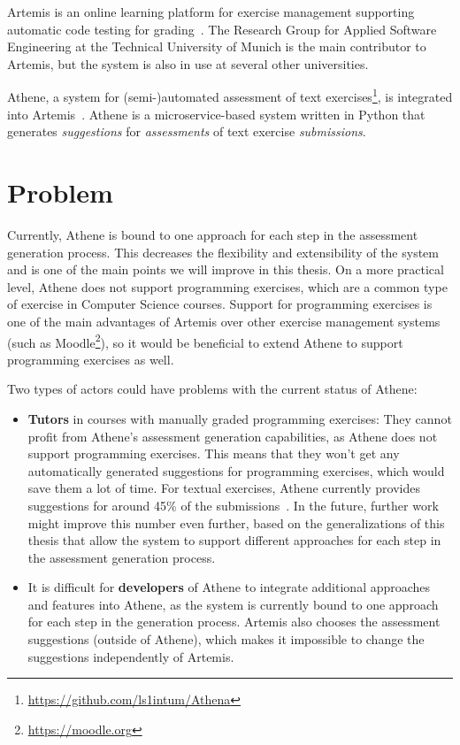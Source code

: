 Artemis is an online learning platform for exercise management supporting automatic code testing for grading~\cite{ArTEMiS}. The Research Group for Applied Software Engineering at the Technical University of Munich is the main contributor to Artemis, but the system is also in use at several other universities.

Athene, a system for (semi-)automated assessment of text exercises\footnote{\url{https://github.com/ls1intum/Athena}}, is integrated into Artemis~\cite{cofee}. Athene is a microservice-based system written in Python that generates \textit{suggestions} for \textit{assessments} of text exercise \textit{submissions}.


\section*{Problem}

Currently, Athene is bound to one approach for each step in the assessment generation process. This decreases the flexibility and extensibility of the system and is one of the main points we will improve in this thesis.
On a more practical level, Athene does not support programming exercises, which are a common type of exercise in Computer Science courses. Support for programming exercises is one of the main advantages of Artemis over other exercise management systems (such as Moodle\footnote{\url{https://moodle.org}}), so it would be beneficial to extend Athene to support programming exercises as well.

Two types of actors could have problems with the current status of Athene:
\begin{itemize}
    \item \textbf{Tutors} in courses with manually graded programming exercises: They cannot profit from Athene's assessment generation capabilities, as Athene does not support programming exercises. This means that they won't get any automatically generated suggestions for programming exercises, which would save them a lot of time.
    For textual exercises, Athene currently provides suggestions for around 45\% of the submissions~\cite{cofee2}. In the future, further work might improve this number even further, based on the generalizations of this thesis that allow the system to support different approaches for each step in the assessment generation process.
    \item It is difficult for \textbf{developers} of Athene to integrate additional approaches and features into Athene, as the system is currently bound to one approach for each step in the generation process. Artemis also chooses the assessment suggestions (outside of Athene), which makes it impossible to change the suggestions independently of Artemis.
\end{itemize}

